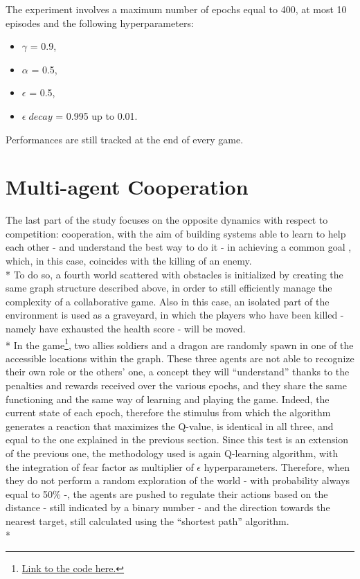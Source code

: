 The experiment involves a maximum number of epochs equal to 400,
at most 10 episodes and the following hyperparameters:
\begin{itemize}[noitemsep, topsep=0ex]
  \item $\gamma$ = 0.9,
  \item $\alpha$ = 0.5,
  \item $\epsilon$ = 0.5,
  \item $\epsilon\;decay$ = 0.995 up to 0.01.
\end{itemize}
Performances are still tracked at the end of every game.

\section{Multi-agent Cooperation}
The last part of the study focuses on the opposite dynamics with respect to competition: cooperation, with the aim of building systems able to learn to help each other - and understand the best way to do it - in achieving a common goal , which, in this case, coincides with the killing of an enemy.\\*
To do so, a fourth world scattered with obstacles is initialized by creating the same graph structure described above, in order to still efficiently manage the complexity of a collaborative game. Also in this case, an isolated part of the environment is used as a graveyard, in which the players who have been killed - namely have exhausted the health score - will be moved.\\*
In the game\footnote{\href{https://github.com/moiraghif/DragonHunting/tree/master/TeamWork}{Link to the code here.}}, two allies soldiers and a dragon are randomly spawn in one of the accessible locations within the graph. These three agents are not able to recognize their own role or the others' one, a concept they will ``understand'' thanks to the penalties and rewards received over the various epochs, and they share the same functioning and the same way of learning and playing the game. Indeed, the current state of each epoch, therefore the stimulus from which the algorithm generates a reaction that maximizes the Q-value, is identical in all three, and equal to the one explained in the previous section. Since this test is an extension of the previous one, the methodology used is again Q-learning algorithm, with the integration of fear factor as multiplier of $\epsilon$ hyperparameters. Therefore, when they do not perform a random exploration of the world - with probability always equal to 50\% -, the agents are pushed to regulate their actions based on the distance - still indicated by a binary number - and the direction towards the nearest target, still calculated using the ``shortest path'' algorithm.\\*
